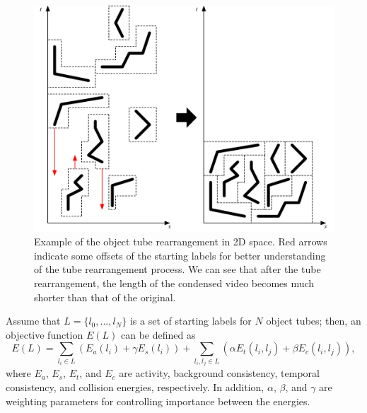 \documentclass[11pt]{hyu_thesis}
\begin{document}
\begin{figure}
	\begin{center}
		\includegraphics[width=\linewidth]{video_synopsis_2d.pdf}
	\end{center}
	\caption{Example of the object tube rearrangement in 2D space. Red arrows indicate some offsets of the starting labels for better understanding of the tube rearrangement process. We can see that after the tube rearrangement, the length of the condensed video becomes much shorter than that of the original.}
	\label{fig:video_synopsis_2d}
\end{figure}

Assume that $L=\{l_0,...,l_N\}$ is a set of starting labels for $N$ object tubes; then, an objective function $E(L)$ can be defined as
\begin{equation}
\label{eq:basic_form}
E(L)=\sum_{l_i \in L} \left( E_a(l_i) + \gamma E_s(l_i) \right) + \sum_{l_i,l_j \in L} \left( \alpha E_t(l_i, l_j) + \beta E_c(l_i, l_j) \right),
\end{equation}
where $E_a$, $E_s$, $E_t$, and $E_c$ are activity, background consistency, temporal consistency, and collision energies, respectively. In addition, $\alpha$, $\beta$, and $\gamma$ are weighting parameters for controlling importance between the energies.
\end{document}
